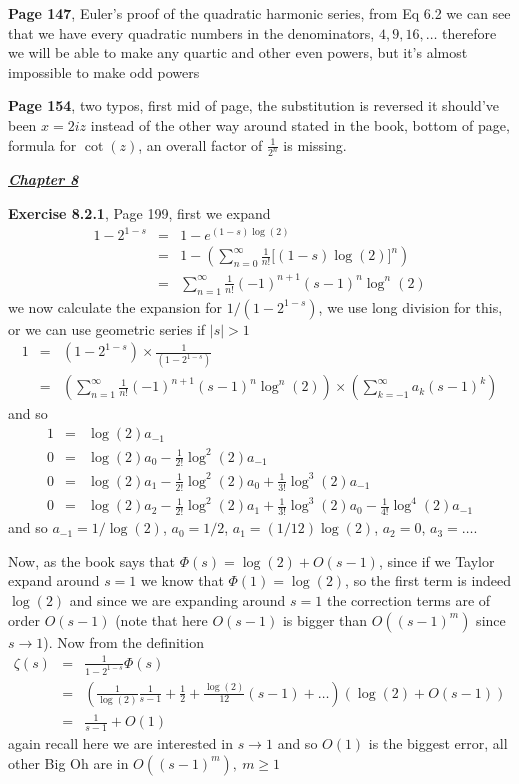 \documentclass[aps,preprint,preprintnumbers,nofootinbib,showpacs,prd]{revtex4-1}
\newcommand{\nbea}{\begin{eqnarray*}}
\newcommand{\neea}{\end{eqnarray*}}
\begin{document}
{\bf Page 147}, Euler's proof of the quadratic harmonic series, from Eq 6.2 we can see that we have every quadratic numbers in the denominators, $4,9,16,\ldots$ therefore we will be able to make any quartic and other even powers, but it's almost impossible to make odd powers

{\bf Page 154}, two typos, first mid of page, the substitution is reversed it should've been $x = 2iz$ instead of the other way around stated in the book, bottom of page, formula for $\cot(z)$, an overall factor of $\frac{1}{2^n}$ is missing.

\bigskip
\underline{\textit{\textbf{Chapter 8}}}
\bigskip

{\bf Exercise 8.2.1}, Page 199, first we expand
%
\nbea
1 - 2^{1-s} & = & 1 - e^{(1-s)\log(2)} \\
& = & 1 - \left ( \sum_{n=0}^\infty \frac{1}{n!} \lbrack(1-s)\log(2)\rbrack^n \right ) \\
& = & \sum_{n=1}^\infty \frac{1}{n!} (-1)^{n+1} (s-1)^n \log^n(2)
\neea
%
we now calculate the expansion for $1/(1 - 2^{1-s})$, we use long division for this, or we can use geometric series if $|s| > 1$
%
\nbea
1 & = & (1 - 2^{1-s})\times\frac{1}{(1 - 2^{1-s})} \\
& = & \left(\sum_{n=1}^\infty \frac{1}{n!} (-1)^{n+1} (s-1)^n \log^n(2)\right)\times\left(\sum_{k=-1}^\infty a_k(s-1)^k\right)
\neea
%
and so
%
\nbea
1 & = & \log(2) a_{-1} \\
0 & = & \log(2) a_0 - \frac{1}{2!}\log^2(2) a_{-1} \\
0 & = & \log(2) a_1 - \frac{1}{2!}\log^2(2) a_{0} + \frac{1}{3!}\log^3(2) a_{-1} \\
0 & = & \log(2) a_2 - \frac{1}{2!}\log^2(2) a_{1} + \frac{1}{3!}\log^3(2) a_{0} - \frac{1}{4!}\log^4(2) a_{-1}
\neea
%
and so $a_{-1} = 1/\log(2)$, $a_0 = 1/2$, $a_1 = (1/12)\log(2)$, $a_2 = 0$, $a_3 = \ldots$.

Now, as the book says that $\Phi(s) = \log(2) + O(s-1)$, since if we Taylor expand around $s=1$ we know that $\Phi(1) = \log(2)$, so the first term is indeed $\log(2)$ and since we are expanding around $s=1$ the correction terms are of order $O(s-1)$ (note that here $O(s-1)$ is bigger than $O((s-1)^m)$ since $s\to1$). Now from the definition
%
\nbea
\zeta(s) & = & \frac{1}{1-2^{1-s}} \Phi(s) \\
& = & \left( \frac{1}{\log(2)}\frac{1}{s-1} + \frac{1}{2} + \frac{\log(2)}{12}(s-1) + \ldots \right)\left( \log(2) + O(s-1)\right) \\
& = & \frac{1}{s-1} + O(1)
\neea
%
again recall here we are interested in $s\to1$ and so $O(1)$ is the biggest error, all other Big Oh are in $O((s-1)^m),~m \ge 1$
\end{document}
